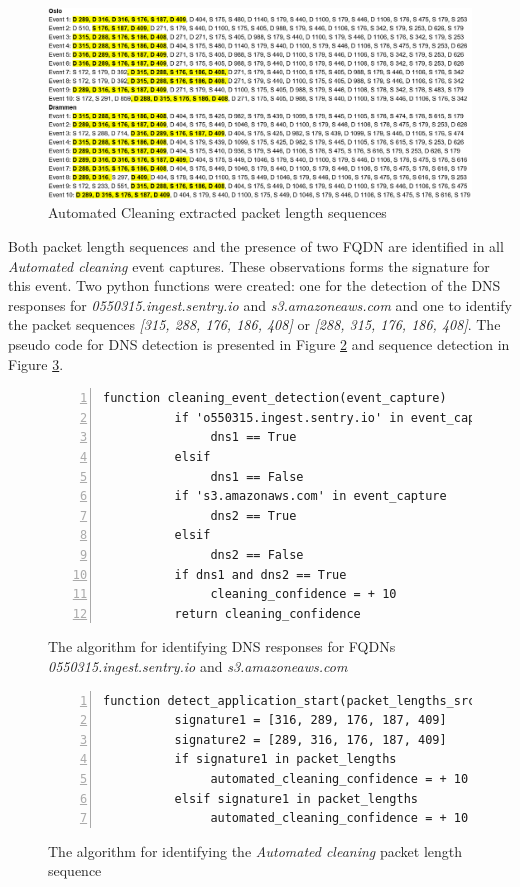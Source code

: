 \begin{figure}[H]
    \centering
    \includegraphics[width=\textwidth]{figures/Sequence_AC.png}
    \caption{Automated Cleaning extracted packet length sequences}
    \label{fig:ACseq}
\end{figure}

Both packet length sequences and the presence of two FQDN are identified in all \textit{Automated cleaning} event captures. These observations forms the signature for this event. Two python functions were created: one for the detection of the DNS responses for \textit{0550315.ingest.sentry.io} and \textit{s3.amazoneaws.com} and one to identify the packet sequences \textit{[315, 288, 176, 186, 408]} or \textit{[288, 315, 176, 186, 408]}. The pseudo code for DNS detection is presented in Figure \ref{fig:pesudo_code_cleaning_event} and sequence detection in Figure \ref{fig:Pesudo_code_AC}.

\begin{figure}[H]
    \centering
    \begin{lstlisting}[numbers=left]
     function cleaning_event_detection(event_capture)
          if 'o550315.ingest.sentry.io' in event_capture
               dns1 == True
          elsif
               dns1 == False
          if 's3.amazonaws.com' in event_capture
               dns2 == True
          elsif
               dns2 == False
          if dns1 and dns2 == True      
               cleaning_confidence = + 10
          return cleaning_confidence
    \end{lstlisting}
    \caption{The algorithm for identifying DNS responses for FQDNs \textit{0550315.ingest.sentry.io} and \textit{s3.amazoneaws.com}}
    \label{fig:pesudo_code_cleaning_event}
\end{figure}

\begin{figure}[H]
    \centering
    \begin{lstlisting}[numbers=left]
     function detect_application_start(packet_lengths_src)
          signature1 = [316, 289, 176, 187, 409]
          signature2 = [289, 316, 176, 187, 409]
          if signature1 in packet_lengths
               automated_cleaning_confidence = + 10
          elsif signature1 in packet_lengths
               automated_cleaning_confidence = + 10
    \end{lstlisting}
    \caption{The algorithm for identifying the \textit{Automated cleaning} packet length sequence}
    \label{fig:Pesudo_code_AC}
\end{figure}

